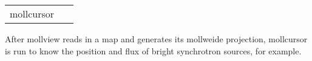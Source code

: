\begin{example}
{
\begin{tabular}{ll} %
mollcursor & \ 
\end{tabular}
}
{After mollview reads in a map and generates
its mollweide projection, mollcursor is run to know the
position and flux of bright synchrotron sources, for example.}
\end{example}


